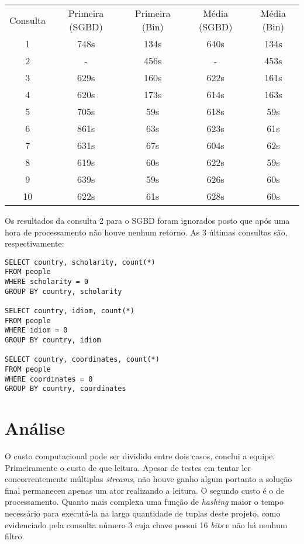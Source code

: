 \documentclass[12pt]{article}
\begin{document}
\begin{center}
\begin{tabular}{ccccc}
Consulta    & Primeira (SGBD) & Primeira (Bin)  & Média (SGBD) & Média (Bin) \\
1           & 748s            & 134s            & 640s         & 134s        \\
2           & -               & 456s            & -            & 453s        \\
3           & 629s            & 160s            & 622s         & 161s        \\
4           & 620s            & 173s            & 614s         & 163s        \\
5           & 705s            & 59s             & 618s         & 59s         \\
6           & 861s            & 63s             & 623s         & 61s         \\
7           & 631s            & 67s             & 604s         & 62s         \\
8           & 619s            & 60s             & 622s         & 59s         \\
9           & 639s            & 59s             & 626s         & 60s         \\
10          & 622s            & 61s             & 628s         & 60s             
\end{tabular}
\end{center}

Os resultados da consulta 2 para o SGBD foram ignorados posto que após uma hora
de processamento não houve nenhum retorno. As 3 últimas consultas são, respectivamente:

\begin{verbatim}
SELECT country, scholarity, count(*)
FROM people
WHERE scholarity = 0
GROUP BY country, scholarity

SELECT country, idiom, count(*)
FROM people
WHERE idiom = 0
GROUP BY country, idiom

SELECT country, coordinates, count(*)
FROM people
WHERE coordinates = 0
GROUP BY country, coordinates
\end{verbatim}

\section{Análise}

O custo computacional pode ser dividido entre dois casos, conclui a equipe.
Primeiramente o custo de que leitura. Apesar de testes em tentar ler concorrentemente
múltiplas \textit{streams}, não houve ganho algum portanto a solução final permaneceu
apenas um ator realizando a leitura. O segundo custo é o de processamento. Quanto mais complexa
uma função de \textit{hashing} maior o tempo necessário para executá-la na larga quantidade
de tuplas deste projeto, como evidenciado pela consulta número 3 cuja chave possui 16 \textit{bits}
e não há nenhum filtro.
\end{document}
